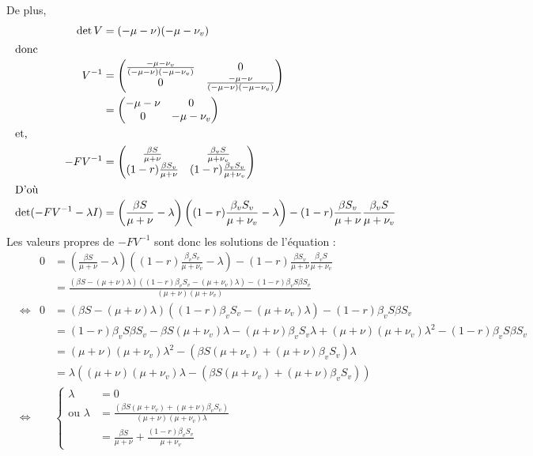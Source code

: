 \documentclass[11pt]{article}
\newcommand{\ssi}{\Longleftrightarrow}
\begin{document}
De plus, 
\begin{align*}
	\det V &= (- \mu -\nu)(-\mu-\nu_v)\\
	\intertext{donc}
	V^{-1} &= \begin{pmatrix}
		\frac{-\mu-\nu_v}{(-\mu - \nu)(-\mu - \nu_v)} & 0\\
		0 & \frac{-\mu-\nu}{(-\mu - \nu)(-\mu - \nu_v)}
	\end{pmatrix}\\
	&= \begin{pmatrix}
		-\mu-\nu & 0\\
		0 & -\mu-\nu_v
	\end{pmatrix}\\
	\intertext{et, }
	-F V^{-1} &= 
		\begin{pmatrix}
			\frac{\beta S}{ \mu + \nu} & \frac{\beta_v S}{ \mu + \nu_v} \\
			(1-r)\frac{\beta S_v}{ \mu + \nu}  & (1-r)\frac{\beta_v S_v}{ \mu + \nu_v} 
		\end{pmatrix} \\
	\intertext{D'o\`u}
	\det(-FV^{-1} - \lambda I) &= \left(\frac{\beta S}{ \mu + \nu} - \lambda \right) \left((1-r)\frac{\beta_v S_v}{ \mu + \nu_v} -\lambda \right) - (1-r)\frac{\beta S_v}{ \mu + \nu}\frac{\beta_v S}{ \mu + \nu_v}
\end{align*}
Les valeurs propres de $-F V^{-1}$ sont donc les solutions de l'\'equation :
\begin{align*}
	&& 0 &= \left(\frac{\beta S}{ \mu + \nu} - \lambda \right) \left((1-r)\frac{\beta_v S_v}{ \mu + \nu_v} -\lambda \right) - (1-r)\frac{\beta S_v}{ \mu + \nu}\frac{\beta_v S}{ \mu + \nu_v}\\
	&& &= \frac{\left(\beta S - (\mu +\nu) \lambda\right)\left((1-r)\beta_v S_v- (\mu + \nu_v)\lambda \right) - (1-r) \beta_v S \beta S_v}{(\mu + \nu)(\mu + \nu_v)}\\
	&\ssi& 0 &=  \left(\beta S - (\mu +\nu) \lambda\right)\left((1-r)\beta_v S_v- (\mu + \nu_v)\lambda \right) - (1-r) \beta_v S \beta S_v\\
	&&& = (1-r) \beta_v S \beta S_v - \beta S (\mu + \nu_v) \lambda  - (\mu + \nu)\beta_v S_v \lambda +(\mu + \nu) (\mu + \nu_v) \lambda ^2 - (1-r) \beta_v S \beta S_v\\
	&&& = (\mu + \nu) (\mu + \nu_v) \lambda ^2 - (\beta S (\mu + \nu_v)+ (\mu + \nu)\beta_v S_v) \lambda\\
	&&& = \lambda ((\mu + \nu) (\mu + \nu_v) \lambda  - (\beta S (\mu + \nu_v)+ (\mu + \nu)\beta_v S_v))\\
	&\ssi&& \left\{\begin{aligned}
		\lambda &= 0 \\
		\text{ou } \lambda &= \frac{(\beta S (\mu + \nu_v)+ (\mu + \nu)\beta_v S_v)}{(\mu + \nu) (\mu + \nu_v) \lambda}\\
			&= \frac{\beta S}{\mu + \nu} + \frac{(1-r) \beta_v S_v}{\mu +\nu_v}
	\end{aligned}\right.
\end{align*} 
\end{document}
